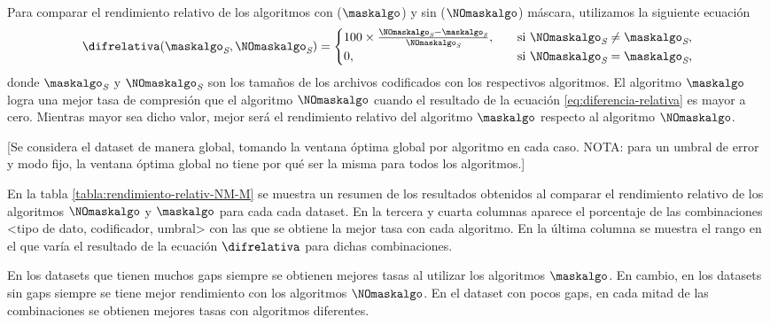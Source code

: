 \clearpage

Para comparar el rendimiento relativo de los algoritmos con ($\maskalgo$) y sin ($\NOmaskalgo$) máscara, utilizamos la siguiente ecuación
\vspace{-8pt}
\newcommand{\nmbits}{\NOmaskalgo_{\textit{S}}}
\newcommand{\mbits}{\maskalgo_\textit{S}}
\begin{equation}
\label{eq:diferencia-relativa}
%
 \difrelativa(\mbits, \nmbits)  =
  \begin{cases}
   100\times\frac{\nmbits - \mbits}{ \nmbits }, \quad & \text{si } \nmbits \ne \mbits, \\
   0,                   & \text{si } \nmbits = \mbits,
  \end{cases}
%  
\end{equation}
donde $\mbits$ y $\nmbits$ son los tamaños de los archivos codificados con los respectivos algoritmos. El algoritmo $\maskalgo$ logra una mejor tasa de compresión que el algoritmo $\NOmaskalgo$ cuando el resultado de la ecuación \ref{eq:diferencia-relativa} es mayor a cero. Mientras mayor sea dicho valor, mejor será el rendimiento relativo del algoritmo $\maskalgo$ respecto al algoritmo $\NOmaskalgo$.

[Se considera el dataset de manera global, tomando la ventana óptima global por algoritmo en cada caso. NOTA: para un umbral de error y modo fijo, la ventana óptima global no tiene por qué ser la misma para todos los algoritmos.]

En la tabla \ref{tabla:rendimiento-relativ-NM-M} se muestra un resumen de los resultados obtenidos al comparar el rendimiento relativo de los algoritmos $\NOmaskalgo$ y $\maskalgo$ para cada cada dataset. En la tercera y cuarta columnas aparece el porcentaje de las combinaciones <tipo de dato, codificador, umbral> con las que se obtiene la mejor tasa con cada algoritmo. En la última columna se muestra el rango en el que varía el resultado de la ecuación $\difrelativa$ para dichas combinaciones.

En los datasets que tienen muchos gaps siempre se obtienen mejores tasas al utilizar los algoritmos $\maskalgo$. En cambio, en los datasets sin gaps siempre se tiene mejor rendimiento con los algoritmos $\NOmaskalgo$. En el dataset con pocos gaps, en cada mitad de las combinaciones se obtienen mejores tasas con algoritmos diferentes.\\

\vspace{-5pt}

\vspace{-10pt}

